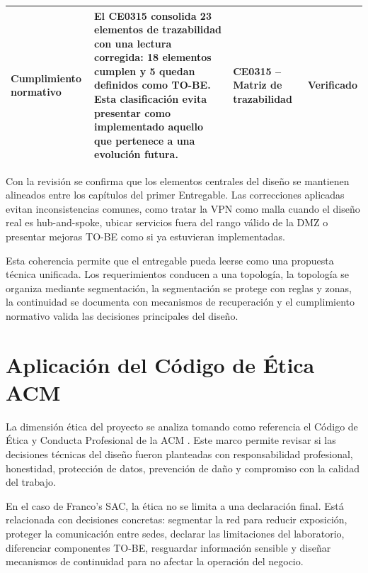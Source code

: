 \documentclass[11pt, a4paper, oneside]{report}
\begin{document}
\begin{xltabular}{\textwidth}{@{}|L{3.3cm}|X|L{3.7cm}|L{2.1cm}|@{}}
{\small Cumplimiento normativo} &
{\small El CE0315 consolida 23 elementos de trazabilidad con una lectura corregida: 18 elementos cumplen y 5 quedan definidos como TO-BE. Esta clasificación evita presentar como implementado aquello que pertenece a una evolución futura.} &
{\small CE0315 -- Matriz de trazabilidad} &
{\small Verificado} \\ \hline

\end{xltabular}

\normalsize

Con la revisión se confirma que los elementos centrales del diseño se mantienen alineados entre los capítulos del primer Entregable. Las correcciones aplicadas evitan inconsistencias comunes, como tratar la VPN como malla cuando el diseño real es hub-and-spoke, ubicar servicios fuera del rango válido de la DMZ o presentar mejoras TO-BE como si ya estuvieran implementadas.

Esta coherencia permite que el entregable pueda leerse como una propuesta técnica unificada. Los requerimientos conducen a una topología, la topología se organiza mediante segmentación, la segmentación se protege con reglas y zonas, la continuidad se documenta con mecanismos de recuperación y el cumplimiento normativo valida las decisiones principales del diseño.

\section{Aplicación del Código de Ética ACM}

La dimensión ética del proyecto se analiza tomando como referencia el Código de Ética y Conducta Profesional de la ACM \cite{acmcode}. Este marco permite revisar si las decisiones técnicas del diseño fueron planteadas con responsabilidad profesional, honestidad, protección de datos, prevención de daño y compromiso con la calidad del trabajo.

En el caso de Franco's SAC, la ética no se limita a una declaración final. Está relacionada con decisiones concretas: segmentar la red para reducir exposición, proteger la comunicación entre sedes, declarar las limitaciones del laboratorio, diferenciar componentes TO-BE, resguardar información sensible y diseñar mecanismos de continuidad para no afectar la operación del negocio.

\renewcommand{\arraystretch}{1.3}
\footnotesize
{}
\end{document}
